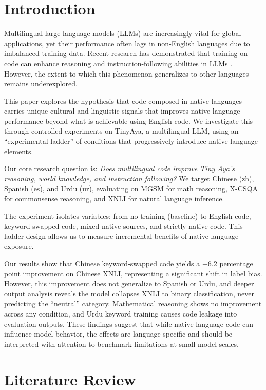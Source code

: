 \documentclass[conference]{IEEEtran}
\begin{document}
\IEEEpeerreviewmaketitle

\section{Introduction}

Multilingual large language models (LLMs) are increasingly vital for global applications, yet their performance often lags in non-English languages due to imbalanced training data. Recent research has demonstrated that training on code can enhance reasoning and instruction-following abilities in LLMs \cite{code_or_not}. However, the extent to which this phenomenon generalizes to other languages remains underexplored.

This paper explores the hypothesis that code composed in native languages carries unique cultural and linguistic signals that improves native language performance beyond what is achievable using English code. We investigate this through controlled experiments on TinyAya, a multilingual LLM, using an ``experimental ladder'' of conditions that progressively introduce native-language elements.

Our core research question is: \textit{Does multilingual code improve Tiny Aya's reasoning, world knowledge, and instruction following?} We target Chinese (zh), Spanish (es), and Urdu (ur), evaluating on MGSM for math reasoning, X-CSQA for commonsense reasoning, and XNLI for natural language inference.

The experiment isolates variables: from no training (baseline) to English code, keyword-swapped code, mixed native sources, and strictly native code. This ladder design allows us to measure incremental benefits of native-language exposure.

Our results show that Chinese keyword-swapped code yields a +6.2 percentage point improvement on Chinese XNLI, representing a significant shift in label bias. However, this improvement does not generalize to Spanish or Urdu, and deeper output analysis reveals the model collapses XNLI to binary classification, never predicting the ``neutral'' category. Mathematical reasoning shows no improvement across any condition, and Urdu keyword training causes code leakage into evaluation outputs. These findings suggest that while native-language code can influence model behavior, the effects are language-specific and should be interpreted with attention to benchmark limitations at small model scales.

\section{Literature Review}
\end{document}
